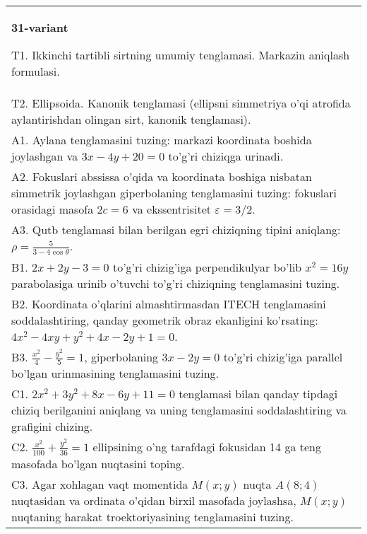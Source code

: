 \documentclass{article}
\begin{document}
\begin{tabular}{m{17cm}}
\textbf{31-variant}
\newline

T1. Ikkinchi tartibli sirtning umumiy tenglamasi. Markazin aniqlash formulasi.\\

T2. Ellipsoida. Kanonik tenglamasi (ellipsni simmetriya o'qi atrofida aylantirishdan olingan sirt, kanonik tenglamasi).\\

A1. Aylana tenglamasini tuzing: markazi koordinata boshida joylashgan va $3x-4y+20=0$ to'g'ri chiziqga urinadi.\\

A2. Fokuslari abssissa o'qida va koordinata boshiga nisbatan simmetrik joylashgan giperbolaning tenglamasini tuzing: fokuslari orasidagi masofa $2c=6$ va ekssentrisitet $\varepsilon=3/2$.\\

A3. Qutb tenglamasi bilan berilgan egri chiziqning tipini aniqlang: $\rho=\frac{5}{3-4\cos\theta}$.\\

B1. $2x + 2y - 3 = 0$ to'g'ri chizig'iga perpendikulyar bo'lib $x^{2} = 16y$ parabolasiga urinib o'tuvchi to'g'ri chiziqning tenglamasini tuzing.  \\

B2. Koordinata o'qlarini almashtirmasdan ITECH tenglamasini soddalashtiring, qanday geometrik obraz ekanligini ko'rsating: $4x^{2} - 4xy + y^{2} + 4x - 2y + 1 = 0$.  \\

B3. $\frac{x^{2}}{4} - \frac{y^{2}}{5} = 1$, giperbolaning $3x - 2y = 0$ to'g'ri chizig'iga parallel bo'lgan urinmasining tenglamasini tuzing.  \\

C1. $2x^{2} + 3y^{2} + 8x - 6y + 11 = 0$ tenglamasi bilan qanday tipdagi chiziq berilganini aniqlang va uning tenglamasini soddalashtiring va grafigini chizing.  \\

C2. $\frac{x^{2}}{100} + \frac{y^{2}}{36} = 1$ ellipsining o'ng tarafdagi fokusidan 14 ga teng masofada bo'lgan nuqtasini toping.  \\

C3. Agar xohlagan vaqt momentida $M(x;y)$ nuqta $A(8;4)$ nuqtasidan va ordinata o'qidan birxil masofada joylashsa, $M(x;y)$ nuqtaning harakat troektoriyasining tenglamasini tuzing.  \\

\end{tabular}
\vspace{1cm}
\end{document}
